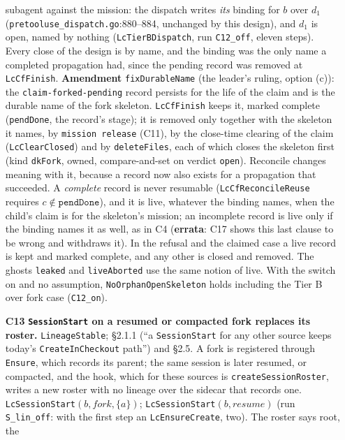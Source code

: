 \documentclass[a4paper,10pt,fleqn]{article}
\newcommand{\fpath}[1]{\texttt{#1}}
\newcommand{\field}[1]{\texttt{#1}}
\begin{document}
\begin{enumerate}
    subagent against the mission: the dispatch writes \emph{its} binding for
    $b$ over $d_1$ (\fpath{pretooluse\_dispatch.go}:880--884, unchanged by
    this design), and $d_1$ is open, named by nothing
    (\field{LcTierBDispatch}, run \texttt{C12\_off}, eleven steps). Every close
    of the design is by name, and the binding was the only name a completed
    propagation had, since the pending record was removed at \field{LcCfFinish}.
    \textbf{Amendment} \field{fixDurableName} (the leader's ruling, option
    (c)): the \field{claim-forked-pending} record persists for the life of the
    claim and is the durable name of the fork skeleton. \field{LcCfFinish}
    keeps it, marked complete (\field{pendDone}, the record's stage); it is
    removed only together with the skeleton it names, by \field{mission
    release} (C11), by the close-time clearing of the claim
    (\field{LcClearClosed}) and by \field{deleteFiles}, each of which closes
    the skeleton first (kind \field{dkFork}, owned, compare-and-set on
    verdict \field{open}). Reconcile changes meaning with it, because a record
    now also exists for a propagation that succeeded. A \emph{complete}
    record is never resumable (\field{LcCfReconcileReuse} requires
    $c\notin\field{pendDone}$), and it is live, whatever the binding names,
    when the child's claim is for the skeleton's mission; an incomplete record
    is live only if the binding names it as well, as in C4 (\textbf{errata}:
    C17 shows this last clause to be wrong and withdraws it). In the refusal and
    the claimed case a live record is kept and marked complete, and any other
    is closed and removed. The ghosts \field{leaked} and \field{liveAborted}
    use the same notion of live. With the switch on and no assumption,
    \field{NoOrphanOpenSkeleton} holds including the Tier B over fork case
    (\texttt{C12\_on}).
  \item[\textbf{C13}] \textbf{\field{SessionStart} on a resumed or compacted
    fork replaces its roster.} \field{LineageStable}; \S2.1.1 (``a
    \field{SessionStart} for any other source keeps today's
    \field{CreateInCheckout} path'') and \S2.5. A fork is registered through
    \field{Ensure}, which records its parent; the same session is later
    resumed, or compacted, and the hook, which for these sources is
    \field{createSessionRoster}, writes a new roster with no lineage over the
    sidecar that records one. \field{LcSessionStart}$(b,\mathit{fork},\{a\})$;
    \field{LcSessionStart}$(b,\mathit{resume})$ (run \texttt{S\_lin\_off}: with
    the first step an \field{LcEnsureCreate}, two). The roster says root, the

\end{enumerate}
\end{document}
